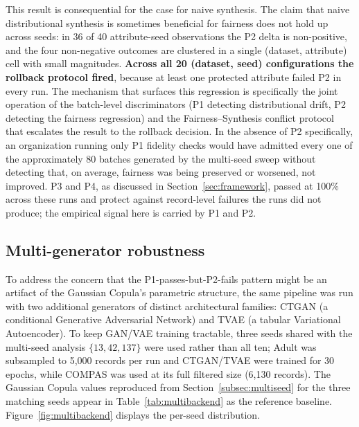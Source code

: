 \documentclass[11pt]{article}
\begin{document}
This result is consequential for the case for naive synthesis. The claim that naive distributional synthesis is sometimes beneficial for fairness does not hold up across seeds: in 36 of 40 attribute-seed observations the P2 delta is non-positive, and the four non-negative outcomes are clustered in a single (dataset, attribute) cell with small magnitudes. \textbf{Across all 20 (dataset, seed) configurations the rollback protocol fired}, because at least one protected attribute failed P2 in every run. The mechanism that surfaces this regression is specifically the joint operation of the batch-level discriminators (P1 detecting distributional drift, P2 detecting the fairness regression) and the Fairness--Synthesis conflict protocol that escalates the result to the rollback decision. In the absence of P2 specifically, an organization running only P1 fidelity checks would have admitted every one of the approximately 80 batches generated by the multi-seed sweep without detecting that, on average, fairness was being preserved or worsened, not improved. P3 and P4, as discussed in Section~\ref{sec:framework}, passed at 100\% across these runs and protect against record-level failures the runs did not produce; the empirical signal here is carried by P1 and P2.

\subsection{Multi-generator robustness}
\label{subsec:multibackend}

To address the concern that the P1-passes-but-P2-fails pattern might be an artifact of the Gaussian Copula's parametric structure, the same pipeline was run with two additional generators of distinct architectural families: CTGAN \cite{Xu2019CTGAN} (a conditional Generative Adversarial Network) and TVAE \cite{Xu2019CTGAN} (a tabular Variational Autoencoder). To keep GAN/VAE training tractable, three seeds shared with the multi-seed analysis $\{13, 42, 137\}$ were used rather than all ten; Adult was subsampled to 5,000 records per run and CTGAN/TVAE were trained for 30 epochs, while COMPAS was used at its full filtered size (6,130 records). The Gaussian Copula values reproduced from Section~\ref{subsec:multiseed} for the three matching seeds appear in Table~\ref{tab:multibackend} as the reference baseline. Figure~\ref{fig:multibackend} displays the per-seed distribution.
\end{document}
